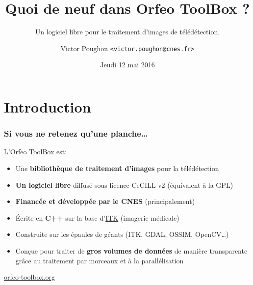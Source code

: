 \documentclass[8pt]{beamer}
\title{Quoi de neuf dans Orfeo ToolBox ?}
\subtitle{Un logiciel libre pour le traitement d'images de télédétection.}
\author{Victor Poughon \texttt{\textless victor.poughon@cnes.fr\textgreater}}
\date{Jeudi 12 mai 2016}
\begin{document}
\begin{frame}
\titlepage
\end{frame}

\section*{Introduction}

\begin{frame}
\frametitle{Si vous ne retenez qu'une planche\ldots}
\begin{block}{L'Orfeo ToolBox est:}
\begin{itemize}
\item Une \textbf{bibliothèque de traitement d'images} pour la télédétection
\item \textbf{Un logiciel libre} diffusé sous licence CeCILL-v2 (équivalent à la GPL)
\item \textbf{Financée et développée par le CNES} (principalement)
\item Écrite en \textbf{C++} sur la base d'\href{www.itk.org}{ITK} (imagerie médicale)
\item Construite sur les épaules de géants (ITK, GDAL, OSSIM, OpenCV\ldots)
\item Conçue pour traiter de \textbf{gros volumes de données} de manière transparente grâce au traitement par morceaux et à la parallélisation
\end{itemize}
\end{block}

\begin{center}
{\huge\textcolor{red}{\href{http://www.orfeo-toolbox.org}{orfeo-toolbox.org}}}
\end{center}

\end{frame}
\end{document}

